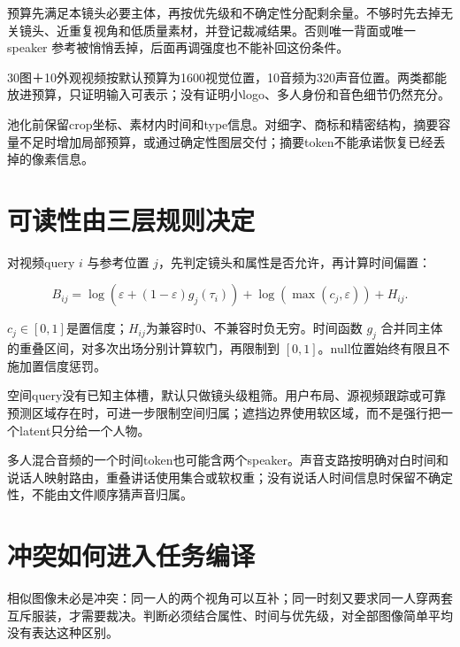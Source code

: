 预算先满足本镜头必要主体，再按优先级和不确定性分配剩余量。不够时先去掉无关镜头、近重复视角和低质量素材，并登记裁减结果。否则唯一背面或唯一 speaker 参考被悄悄丢掉，后面再调强度也不能补回这份条件。

30图＋10外观视频按默认预算为1600视觉位置，10音频为320声音位置。两类都能放进预算，只证明输入可表示；没有证明小logo、多人身份和音色细节仍然充分。

池化前保留crop坐标、素材内时间和type信息。对细字、商标和精密结构，摘要容量不足时增加局部预算，或通过确定性图层交付；摘要token不能承诺恢复已经丢掉的像素信息。

\section{可读性由三层规则决定}\label{seedance-m22-ux53efux8bfbux6027ux7531ux4e09ux5c42ux89c4ux5219ux51b3ux5b9a}

对视频query \(i\) 与参考位置 \(j\)，先判定镜头和属性是否允许，再计算时间偏置：

\[
B_{ij}=\log\left(\varepsilon+(1-\varepsilon)g_j(\tau_i)\right)
+\log(\max(c_j,\varepsilon))+H_{ij}.
\]

\(c_j\in[0,1]\)是置信度；\(H_{ij}\)为兼容时0、不兼容时负无穷。时间函数 \(g_j\) 合并同主体的重叠区间，对多次出场分别计算软门，再限制到 \([0,1]\)。null位置始终有限且不施加置信度惩罚。

空间query没有已知主体槽，默认只做镜头级粗筛。用户布局、源视频跟踪或可靠预测区域存在时，可进一步限制空间归属；遮挡边界使用软区域，而不是强行把一个latent只分给一个人物。

多人混合音频的一个时间token也可能含两个speaker。声音支路按明确对白时间和说话人映射路由，重叠讲话使用集合或软权重；没有说话人时间信息时保留不确定性，不能由文件顺序猜声音归属。

\section{冲突如何进入任务编译}\label{seedance-m22-ux51b2ux7a81ux5982ux4f55ux8fdbux5165ux4efbux52a1ux7f16ux8bd1}

相似图像未必是冲突：同一人的两个视角可以互补；同一时刻又要求同一人穿两套互斥服装，才需要裁决。判断必须结合属性、时间与优先级，对全部图像简单平均没有表达这种区别。

